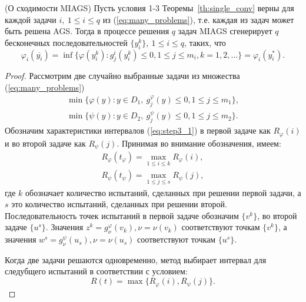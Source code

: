 \begin{theorem}
  \label{th:multi_conv}
   (О сходимости MIAGS) Пусть условия 1-3 Теоремы~\ref{th:single_conv} верны для каждой задачи \(i,\:1\leqslant i\leqslant q\) из (\ref{eq:many_problems}),
т.е. каждая из задач может быть решена AGS.
  Тогда в процессе решения \(q\) задач MIAGS сгенерирует
  \(q\) бесконечных последовательностей \(\{y^k_i\},\:1\leqslant i\leqslant q\), таких, что
  \begin{displaymath}
    \varphi_i(\overline{y_i})=\inf\{ \varphi(y^k_i): g^i_j(y^k_i)\leqslant 0,1\leqslant j\leqslant m_i, k=1,2,\dots\}=\varphi_i(y^*_i).
  \end{displaymath}
\end{theorem}
\begin{proof}
  Рассмотрим две случайно выбранные задачи из множества (\ref{eq:many_problems})
  \begin{equation}
      \begin{array}{lr}
        \min\{\varphi(y):y\in D_1,\: g_j^\varphi(y)\leqslant 0, 1\leqslant j\leqslant m_1\}, \\
        \min\{\psi(y):y\in D_2,\: g_j^\psi(y)\leqslant 0, 1\leqslant j\leqslant m_2\}.
      \end{array}
  \end{equation}
  Обозначим характеристики интервалов (\ref{eq:step3_1}) в первой задаче как \(R_\varphi(i)\)
  и во второй задаче как \(R_\psi(j)\). Принимая во внимание обозначения, имеем:
  \begin{equation}
      \begin{array}{lr}
        R_\varphi(t_\varphi)=\max_{1\leqslant i\leqslant k}R_\varphi(i), \\
        R_\psi(t_\psi)=\max_{1\leqslant j\leqslant s}R_\psi(j),
      \end{array}
  \end{equation}
  где \(k\) обозначает количество испытаний, сделанных при решении первой задачи, а \(s\)
  это количество испытаний, сделанных при решении второй. Последовательность точек испытаний
  в первой задаче обозначим \(\{v^k\}\), во второй задаче \(\{u^s\}\).
  Значения \(z^k=g^\varphi_\nu(v_k),\nu =\nu (v_{k})\) соответствуют точкам \(\{v^k\}\),
  а значения \(w^s=g^\psi_\nu(u_s),\nu =\nu(u_{s})\) соответствуют точкам \(\{u^s\}\).

  Когда две задачи решаются одновременно, метод выбирает интервал для следубщего испытаний в
  соответствии с условием:
  \begin{equation}
    R(t) = \max\{R_\varphi(i),R_\psi(j)\}.
  \end{equation}


\end{proof}
